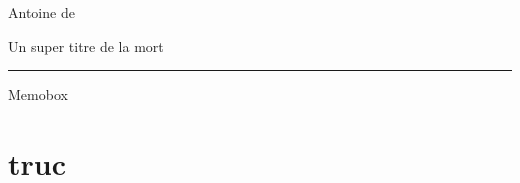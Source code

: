 \documentclass[a4paper,12pt, oneside]{book}
\begin{document}
\sffamily
{}
%
\hspace{0.05\textwidth}
%
%
\parbox[t] [0.991\textheight]{0.70\textwidth}{\large%
\vspace{30px}
\mbox{}\hfill{\Large{{Antoine de ~~~}}}\par
\vfill\mbox{}\vfill

	\begin{flushleft}
	\fontsize{25}{25}\selectfont Un super titre de la mort \end{flushleft}
	\hrule height 4pt
	\begin{flushright}
	\fontsize{20}{20}\selectfont Memobox ~ ~~
	\end{flushright}

\vfill
\vfill
\vfill
\vfill
\vfill
\vfill
\vfill
\vfill
\vfill
\vfill
\vfill
\mbox{}
    }%
\chapter{truc}
\end{document}
